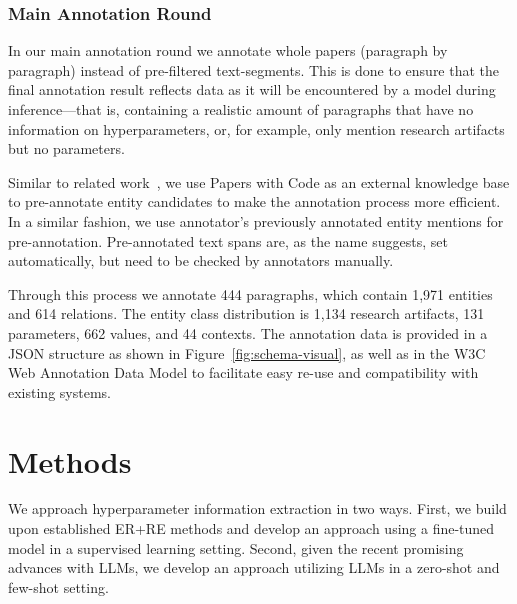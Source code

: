 \subsubsection{Main Annotation Round}


In our main annotation round we annotate whole papers (paragraph by paragraph) instead of pre-filtered text-segments. This is done to ensure that the final annotation result reflects data as it will be encountered by a model during inference---that is, containing a realistic amount of paragraphs that have no information on hyperparameters, or, for example, only mention research artifacts but no parameters.

Similar to related work~\cite{Jain2020scirex}, we use Papers with Code as an external knowledge base to pre-annotate entity candidates to make the annotation process more efficient. In a similar fashion, we use annotator's previously annotated entity mentions for pre-annotation. Pre-annotated text spans are, as the name suggests, set automatically, but need to be checked by annotators manually.

Through this process we annotate 444 paragraphs, which contain 1,971 entities and 614 relations. The entity class distribution is 1,134 research artifacts, 131 parameters, 662 values, and 44 contexts. The annotation data is provided in a JSON structure as shown in Figure~\ref{fig:schema-visual}, as well as in the W3C Web Annotation Data Model to facilitate easy re-use and compatibility with existing systems.




\section{Methods}\label{sec:methods}

We approach hyperparameter information extraction in two ways. First, we build upon established ER+RE methods and develop an approach using a fine-tuned model in a supervised learning setting. Second, given the recent promising advances with LLMs, we develop an approach utilizing LLMs in a zero-shot and few-shot setting.

